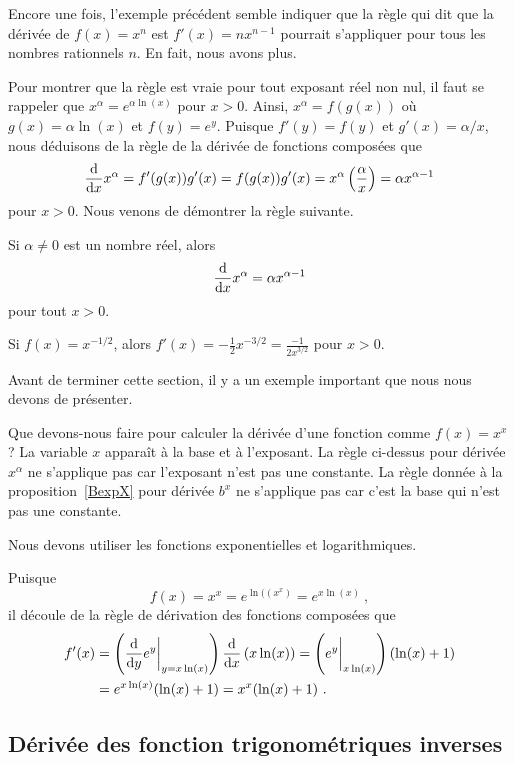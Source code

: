 {Encore une fois, l'exemple précédent semble indiquer que la règle qui
dit que la dérivée de $f(x) = x^n$ est $f'(x) = nx^{n-1}$ pourrait
s'appliquer pour tous les nombres rationnels $n$.  En fait,
nous avons plus.

Pour montrer que la règle est vraie pour tout exposant réel non nul,
il faut se rappeler que $\displaystyle x^\alpha = e^{\alpha \ln(x)}$
pour $x>0$.  Ainsi, $x^\alpha = f(g(x))$ où $g(x) = \alpha \ln(x)$ et
$f(y) = e^y$.   Puisque $f'(y) = f(y)$ et $g'(x) = \alpha / x$,
nous déduisons de la règle de la dérivée de fonctions composées que
\[
\dfdx{x^\alpha}{x} = f'(g(x)) g'(x)
= f(g(x)) g'(x) = x^{\alpha} \left(\frac{\alpha}{x}\right)
= \alpha x^{\alpha-1}
\]
pour $x>0$.  Nous venons de démontrer la règle suivante.

\begin{prop}
Si $\alpha \neq 0$ est un nombre réel, alors
\[
\dfdx{x^\alpha}{x} = \alpha x^{\alpha-1}
\]
pour tout $x>0$.
\end{prop}

\begin{egg}
Si $f(x) = x^{-1/2}$, alors
$\displaystyle f'(x) = -\frac{1}{2} x^{-3/2} = \frac{-1}{2 x^{3/2}}$
pour $x>0$.
\end{egg}

Avant de terminer cette section, il y a un exemple important que nous
nous devons de présenter.

\begin{egg}
Que devons-nous faire pour calculer la dérivée d'une fonction comme
$f(x) = x^x$?  La variable $x$ apparaît à la base et à l'exposant.
La règle ci-dessus pour dérivée $x^\alpha$ ne s'applique pas car
l'exposant n'est pas une constante.  La règle donnée à la
proposition~\ref{BexpX} pour dérivée $b^x$ ne s'applique pas car
c'est la base qui n'est pas une constante.

Nous devons utiliser les fonctions exponentielles et logarithmiques.

Puisque
\[
f(x) = x^x = e^{\ln((x^x)}  = e^{x\ln(x)} \ ,
\]
il découle de la règle de dérivation des fonctions composées que
\begin{align*}
f'(x) &= \left(\dfdx{e^y}{y} \bigg|_{y=x\ln(x)} \right)
\dfdx{\left( x\ln(x)\right)}{x}
= \left( e^y \bigg|_{x\ln(x)} \right) ( \ln(x) + 1 ) \\
&= e^{x\ln(x)} ( \ln(x) + 1)
= x^x( \ln(x) + 1) \ .
\end{align*}
\end{egg}

\subsection{Dérivée des fonction trigonométriques inverses \life \eng}

}
